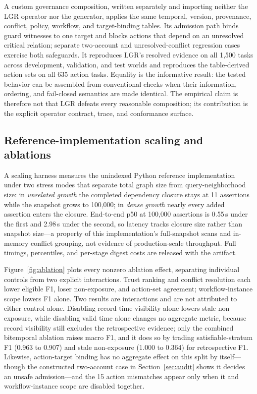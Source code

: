 \documentclass[conference]{IEEEtran}
\newcommand{\lgr}{\textsc{LGR}\xspace}
\begin{document}
A custom governance composition, written separately and importing neither the \lgr{} operator nor the generator, applies the same temporal, version, provenance, conflict, policy, workflow, and target-binding tables. Its admission path binds guard witnesses to one target and blocks actions that depend on an unresolved critical relation; separate two-account and unresolved-conflict regression cases exercise both safeguards. It reproduces \lgr's resolved evidence on all 1{,}500 tasks across development, validation, and test worlds and reproduces the table-derived action sets on all 635 action tasks. Equality is the informative result: the tested behavior can be assembled from conventional checks when their information, ordering, and fail-closed semantics are made identical. The empirical claim is therefore not that \lgr{} defeats every reasonable composition; its contribution is the explicit operator contract, trace, and conformance surface.

\subsection{Reference-implementation scaling and ablations}
A scaling harness measures the unindexed Python reference implementation under two stress modes that separate total graph size from query-neighborhood size: in \emph{unrelated growth} the completed dependency closure stays at 11 assertions while the snapshot grows to 100{,}000; in \emph{dense growth} nearly every added assertion enters the closure. End-to-end p50 at 100{,}000 assertions is 0.55\,s under the first and 2.98\,s under the second, so latency tracks closure size rather than snapshot size---a property of this implementation's full-snapshot scans and in-memory conflict grouping, not evidence of production-scale throughput. Full timings, percentiles, and per-stage digest costs are released with the artifact.


Figure~\ref{fig:ablation} plots every nonzero ablation effect, separating individual controls from two explicit interactions. Trust ranking and conflict resolution each lower eligible F1, loser non-exposure, and action-set agreement; workflow-instance scope lowers F1 alone. Two results are interactions and are not attributed to either control alone. Disabling record-time visibility alone lowers stale non-exposure, while disabling valid time alone changes no aggregate metric, because record visibility still excludes the retrospective evidence; only the combined bitemporal ablation raises macro F1, and it does so by trading satisfiable-stratum F1 (0.963 to 0.907) and stale non-exposure (1.000 to 0.364) for retrospective F1. Likewise, action-target binding has no aggregate effect on this split by itself---though the constructed two-account case in Section~\ref{sec:audit} shows it decides an unsafe admission---and the 15 action mismatches appear only when it and workflow-instance scope are disabled together.
\end{document}
